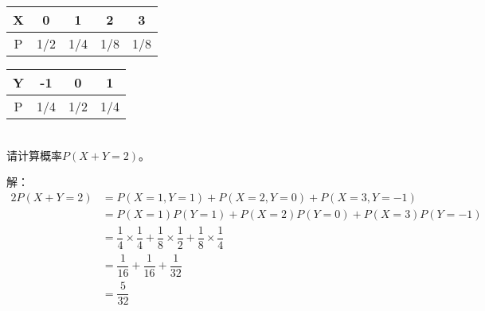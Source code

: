 \documentclass[a4papers]{ctexart}
\begin{document}
\begin{minipage}{0.5\textwidth}  %
\begin{tabular}{c|cccc}
\hline
X & 0 & 1 & 2 & 3 \\
\hline
P & 1/2 & 1/4 & 1/8 & 1/8 \\
\hline
\end{tabular}
\end{minipage}
\hfil
\begin{minipage}{0.5\textwidth}
\begin{tabular}{c|ccc}
\hline
Y & -1 & 0 & 1 \\
\hline
P & 1/4 & 1/2 & 1/4 \\
\hline
\end{tabular} 
\end{minipage}
\\[2mm]                 %
\indent 请计算概率$P(X+Y=2)$。

\noindent 解：
\begin{alignat*}{2}        %
P(X+Y=2) &= P(X=1,Y=1)+P(X=2,Y=0)+P(X=3,Y=-1)\\
&= P(X=1)P(Y=1)+P(X=2)P(Y=0)+P(X=3)P(Y=-1)\\
&= \dfrac{1}{4}\times\dfrac{1}{4}+ \dfrac{1}{8}\times\dfrac{1}{2}+ \dfrac{1}{8}\times\dfrac{1}{4}\\
&= \dfrac{1}{16}+\dfrac{1}{16}+\dfrac{1}{32}\\
&= \dfrac{5}{32}
\end{alignat*}
\end{document}
